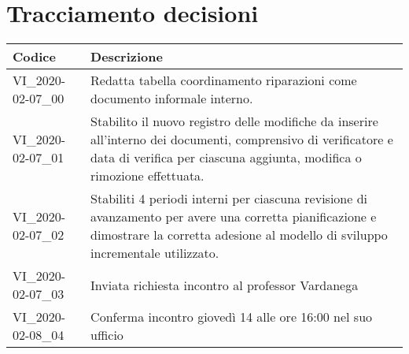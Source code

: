 \section{Tracciamento decisioni}
\renewcommand{\arraystretch}{1.8}

\begin{longtable}{|p{5cm}|p{8cm}|}
	\hline
	
	\rowcolor{header}
	\textbf{Codice} &  \textbf{Descrizione}\\
	
	\hline
	
	VI\_2020-02-07\_00 & Redatta tabella coordinamento riparazioni come documento informale interno.  \\
	VI\_2020-02-07\_01 & Stabilito il nuovo registro delle modifiche da inserire all'interno dei documenti, comprensivo di verificatore e data di verifica per ciascuna aggiunta, modifica o rimozione effettuata.  \\
	VI\_2020-02-07\_02 & Stabiliti 4 periodi interni per ciascuna revisione di avanzamento per avere una corretta pianificazione e dimostrare la corretta adesione al modello di sviluppo incrementale utilizzato.  \\
	VI\_2020-02-07\_03 & Inviata richiesta incontro al professor Vardanega  \\
	VI\_2020-02-08\_04 & Conferma incontro giovedì 14 alle ore 16:00 nel suo ufficio \\
	
	\hline
\end{longtable}